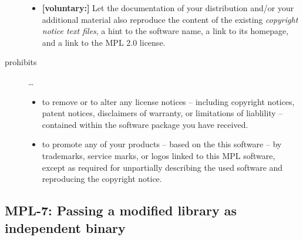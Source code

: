 \begin{description}
\begin{itemize}
  \item \textbf{[voluntary:]} Let the documentation of your distribution and/or
  your additional material  also reproduce the content of the existing
  \emph{copyright notice text files}, a hint to the software name, a link to its
  homepage, and a link to the MPL 2.0 license.

\end{itemize}

\item[prohibits] \ldots
\begin{itemize}
  \item to remove or to alter any license notices -- including copyright
  notices, patent notices, disclaimers of warranty, or limitations of liablility
  -- contained within the software package you have received.
  \item to promote any of your products -- based on the this software -- by
  trademarks, service marks, or logos linked to this MPL software, except as
  required for unpartially describing the used software and reproducing the
  copyright notice.
\end{itemize}

\end{description}


\subsection{MPL-7: Passing a modified library as independent binary}

